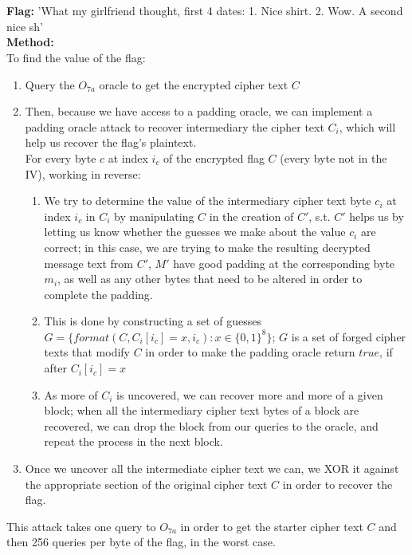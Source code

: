 \documentclass[]{article}
\begin{document}
\section{}
\textbf{Flag:} 'What my girlfriend thought, first 4 dates: 1. Nice shirt. 2. Wow. A second nice sh'
\\
\textbf{Method:}
\\
To find the value of the flag:
\begin{enumerate}
	\item Query the $O_{7a}$ oracle to get the encrypted cipher text $C$
	\item Then, because we have access to a padding oracle, we can implement a padding oracle attack to recover intermediary the cipher text $C_i$, which will help us recover the flag's plaintext.
	\\
	For every byte $c$ at index $i_c$ of the encrypted flag $C$ (every byte not in the IV), working in reverse:
	\begin{enumerate}
		\item We try to determine the value of the intermediary cipher text byte $c_i$ at index $i_c$ in $C_i$ by manipulating $C$ in the creation of $C'$, s.t. $C'$ helps us by letting us know whether the guesses we make about the value $c_i$ are correct; in this case, we are trying to make the resulting decrypted message text from $C'$, $M'$ have good padding at the corresponding byte $m_i$, as well as any other bytes that need to be altered in order to complete the padding.
		\item This is done by constructing a set of guesses $G = \{format(C, C_i[i_c] = x, i_c):x \in \{0,1\}^8\}$; $G$ is a set of forged cipher texts that modify $C$ in order to make the padding oracle return $true$, if after $C_i[i_c] = x$
		\item As more of $C_i$ is uncovered, we can recover more and more of a given block; when all the intermediary cipher text bytes of a block are recovered, we can drop the block from our queries to the oracle, and repeat the process in the next block.
	\end{enumerate}
	\item Once we uncover all the intermediate cipher text we can, we XOR it against the appropriate section of the original cipher text $C$ in order to recover the flag.
\end{enumerate}

This attack takes one query to $O_{7a}$ in order to get the starter cipher text $C$ and then 256 queries per byte of the flag, in the worst case.
\end{document}
